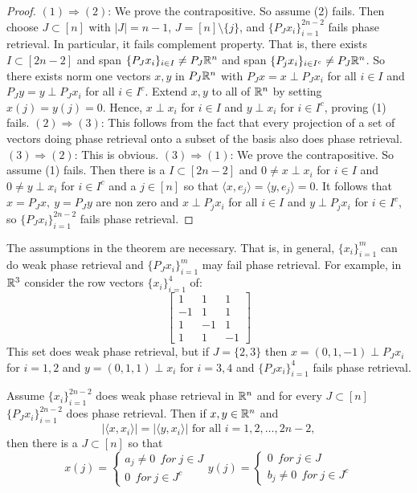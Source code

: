 \begin{proof}
$(1)\Rightarrow (2)$: We prove the contrapositive. So assume (2) fails. Then choose $J\subset [n]$
with $|J|=n-1$, $J=[n]\setminus \{j\}$, and $\{P_Jx_i\}_{i=1}^{2n-2}$ fails phase retrieval. In particular, it fails complement property.
That is, there exists $I\subset [2n-2]$ and span $\{P_Jx_i\}_{i\in I}\not= P_J\mathbb R^n$ and span $\{P_jx_i\}_{i\in I^c}
\not= P_J\mathbb R^n$. So there exists norm one vectors $x,y$ in $P_J\mathbb R^n$ with $P_Jx=x\perp P_Jx_i$ for all $i\in I$
and $P_Jy=y\perp P_Jx_i$ for all $i\in I^c$. Extend $x,y$ to all of $\mathbb R^n$ by setting
$x(j)=y(j)=0$. Hence, $x\perp x_i$ for $i\in I$ and $y\perp x_i$ for $i\in I^c$, proving (1) fails.
\vskip7pt
$(2)\Rightarrow (3)$: This follows from the fact that every projection of a set of vectors doing phase retrieval
onto a subset of the basis also does phase retrieval.
\vskip7pt
$(3)\Rightarrow (2)$: This is obvious.
\vskip7pt
$(3)\Rightarrow (1)$: We prove the contrapositive. So assume (1) fails. Then there is a 
$I\subset [2n-2]$ and $0\not= x\perp x_i$ for $i\in I$ and $0\not= y\perp x_i$ for $i\in I^c$ and a
$j\in [n]$ so that
$\langle x,e_j\rangle =\langle y,e_j\rangle=0$. 
It follows that $x=P_Jx,\ y=P_Jy$ are non zero and $x\perp P_jx_i$ for all $i\in I$ and $y\perp P_jx_i$ for $i\in I^c$,
so $\{P_Jx_i\}_{i=1}^{2n-2}$ fails phase retrieval.
\end{proof}

\begin{remark}
The assumptions in the theorem are necessary. That is, in general, $\{x_i\}_{i=1}^{m}$ can do weak phase retrieval
and $\{P_Jx_i\}_{i=1}^m$ may fail phase retrieval. For example, in $\mathbb R^3$ consider the row vectors $\{x_i\}_{i=1}^4$ of:
\[\begin{bmatrix}
1&1&1\\
-1&1&1\\
1&-1&1\\
1&1&-1
\end{bmatrix}\]
This set does weak phase retrieval, but if $J=\{2,3\}$ then $x=(0,1,-1) \perp P_Jx_i$ for $i=1,2$ and
$y=(0,1,1)\perp x_i$ for $i=3,4$ and $\{P_Jx_i\}_{i=1}^4$ fails phase retrieval.
\end{remark}

\begin{corollary}
Assume $\{x_i\}_{i=1}^{2n-2}$ does weak phase retrieval in $\mathbb R^n$ and for every $J\subset [n]$
$\{P_Jx_i\}_{i=1}^{2n-2}$ does phase retrieval. Then if $x,y\in \mathbb R^n$ and
\[|\langle x,x_i\rangle|=|\langle y,x_i\rangle|\mbox{ for all }i=1,2,\ldots,2n-2,\]
then there is a $J\subset [n]$ so that 
\[ x(j) = \begin{cases} a_j\not= 0\ \ for\ j\in J\\
0\ \ for \ j\in J^c
\end{cases}
 y(j) = \begin{cases}  0\ \ for\ j\in J\\
b_j\not= 0\ \ for \ j\in J^c
\end{cases}
\]
\end{corollary}




